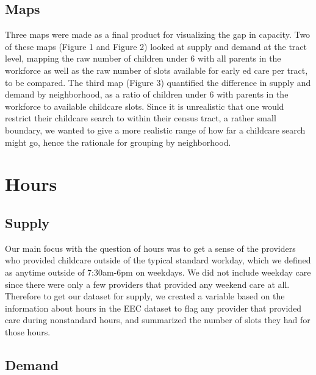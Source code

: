 \documentclass[10pt,letterpaper]{article}
\begin{document}
\subsection{Maps}\label{maps}

Three maps were made as a final product for visualizing the gap in
capacity. Two of these maps (Figure 1 and Figure 2) looked at supply and
demand at the tract level, mapping the raw number of children under 6
with all parents in the workforce as well as the raw number of slots
available for early ed care per tract, to be compared. The third map
(Figure 3) quantified the difference in supply and demand by
neighborhood, as a ratio of children under 6 with parents in the
workforce to available childcare slots. Since it is unrealistic that one
would restrict their childcare search to within their census tract, a
rather small boundary, we wanted to give a more realistic range of how
far a childcare search might go, hence the rationale for grouping by
neighborhood.

\section{Hours}\label{hours}

\subsection{Supply}\label{supply-1}

Our main focus with the question of hours was to get a sense of the
providers who provided childcare outside of the typical standard
workday, which we defined as anytime outside of 7:30am-6pm on weekdays.
We did not include weekday care since there were only a few providers
that provided any weekend care at all. Therefore to get our dataset for
supply, we created a variable based on the information about hours in
the EEC dataset to flag any provider that provided care during
nonstandard hours, and summarized the number of slots they had for those
hours.

\subsection{Demand}\label{demand-1}
\end{document}
